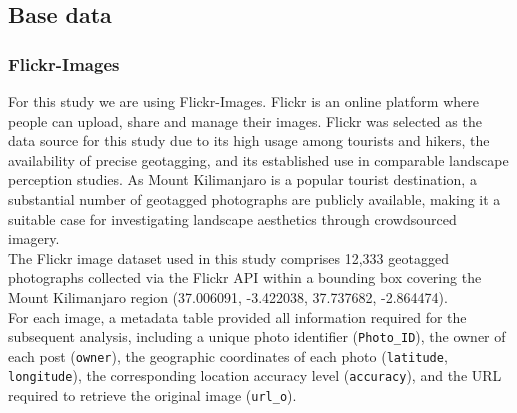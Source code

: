 \documentclass[hidelinks, 11pt]{article}
\begin{document}
\subsection{Base data}
\subsubsection{Flickr-Images}
For this study we are using Flickr-Images. Flickr is an online platform where people can upload, share and manage their images. Flickr was selected as the data source for this study due to its high usage among tourists and hikers, the availability of precise geotagging, and its established use in comparable landscape perception studies. As Mount Kilimanjaro is a popular tourist destination, a substantial number of geotagged photographs are publicly available, making it a suitable case for investigating landscape aesthetics through crowdsourced imagery.
\\
The Flickr image dataset used in this study comprises 12{,}333 geotagged photographs collected via the Flickr API within a bounding box covering the Mount Kilimanjaro region (37.006091, -3.422038, 37.737682, -2.864474).
\\
For each image, a metadata table provided all information required for the subsequent analysis, including a unique photo identifier (\texttt{Photo\_ID}), the owner of each post (\texttt{owner}), the geographic coordinates of each 
photo (\texttt{latitude}, \texttt{longitude}), the corresponding location accuracy level (\texttt{accuracy}), and the URL required to retrieve the original image (\texttt{url\_o}).
\end{document}
